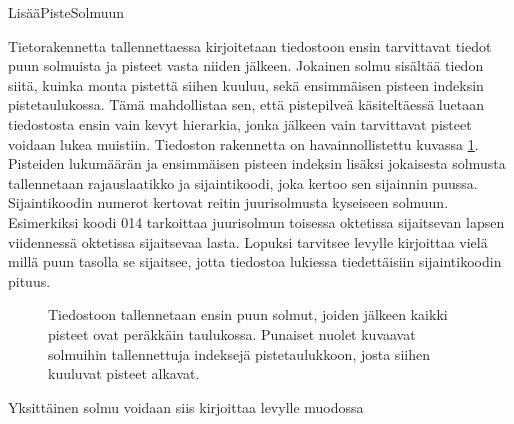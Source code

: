 \begin{algorithm}[!h]
    \caption{LisääPisteSolmuun}
    \label{alg:lisaaPiste}
    
\end{algorithm}

Tietorakennetta tallennettaessa kirjoitetaan tiedostoon ensin tarvittavat tiedot puun solmuista ja pisteet vasta niiden jälkeen. Jokainen solmu sisältää tiedon siitä, kuinka monta pistettä siihen kuuluu, sekä ensimmäisen pisteen indeksin pistetaulukossa. Tämä mahdollistaa sen, että pistepilveä käsiteltäessä luetaan tiedostosta ensin vain kevyt hierarkia, jonka jälkeen vain tarvittavat pisteet voidaan lukea muistiin. Tiedoston rakennetta on havainnollistettu kuvassa \ref{layout}. Pisteiden lukumäärän ja ensimmäisen pisteen indeksin lisäksi jokaisesta solmusta tallennetaan rajauslaatikko ja sijaintikoodi, joka kertoo sen sijainnin puussa. Sijaintikoodin  numerot kertovat reitin juurisolmusta kyseiseen solmuun. Esimerkiksi koodi 014 tarkoittaa juurisolmun toisessa oktetissa sijaitsevan lapsen viidennessä oktetissa sijaitsevaa lasta. Lopuksi tarvitsee levylle kirjoittaa vielä millä puun tasolla se sijaitsee, jotta tiedostoa lukiessa tiedettäisiin sijaintikoodin pituus.

\begin{figure}
    \centering
    
    \caption{Tiedostoon tallennetaan ensin puun solmut, joiden jälkeen kaikki pisteet ovat peräkkäin taulukossa. Punaiset nuolet kuvaavat solmuihin tallennettuja indeksejä pistetaulukkoon, josta siihen kuuluvat pisteet alkavat.}
    \label{layout}
\end{figure}

Yksittäinen solmu voidaan siis kirjoittaa levylle muodossa 



